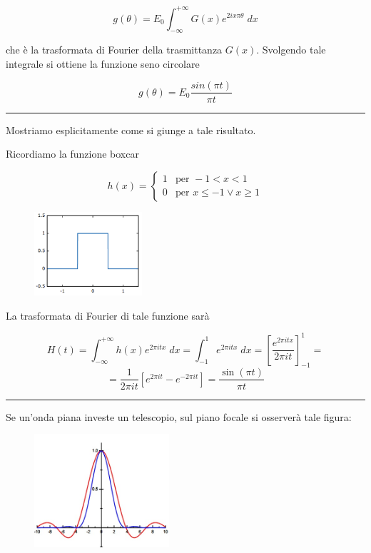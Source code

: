 \begin{equation*}
    g(\theta) = E_0 \int_{-\infty}^{+\infty} G(x)e^{2ix\pi\theta} \; dx
\end{equation*}

che è la trasformata di Fourier della trasmittanza $G(x)$. Svolgendo tale integrale si ottiene la funzione seno circolare

$$g(\theta)=E_0 \frac{sin(\pi t)}{\pi t}$$

\rule[7pt]{\linewidth}{0.4pt}

Mostriamo esplicitamente come si giunge a tale risultato.

Ricordiamo la funzione boxcar

\begin{minipage}{0.5\textwidth}
    $$h(x)=
    \begin{cases}
        1 & \text{per } -1<x<1\\
        0 & \text{per } x \leq -1 \vee x \geq 1
    \end{cases}$$
\end{minipage}
\begin{minipage}{0.5\textwidth}
    \begin{figure}[H]
        \centering
        \includegraphics[width=4cm]{immagini/funzione_boxcar.png}
    \end{figure}
\end{minipage}

La trasformata di Fourier di tale funzione sarà

$$H(t)=\int_{-\infty}^{+\infty} h(x) e^{2 \pi i tx} \; dx
=\int_{-1}^{1} e^{2 \pi i tx} \; dx
=\left[ \frac{e^{2 \pi i tx}}{2 \pi i t} \right]_{-1}^{1}=$$
$$=\frac{1}{2\pi i t} \left[ e^{2 \pi i t} - e^{-2 \pi i t} \right]
=\frac{\sin{(\pi t)}}{\pi t}$$

\rule[7pt]{\linewidth}{0.4pt}

Se un'onda piana investe un telescopio, sul piano focale si osserverà tale figura:

\begin{figure}[H]
    \centering
    \includegraphics[width=5cm]{WhatsApp Image 2023-01-09 at 02.57.58.jpeg}
    \label{fig:my_label9}
\end{figure}


